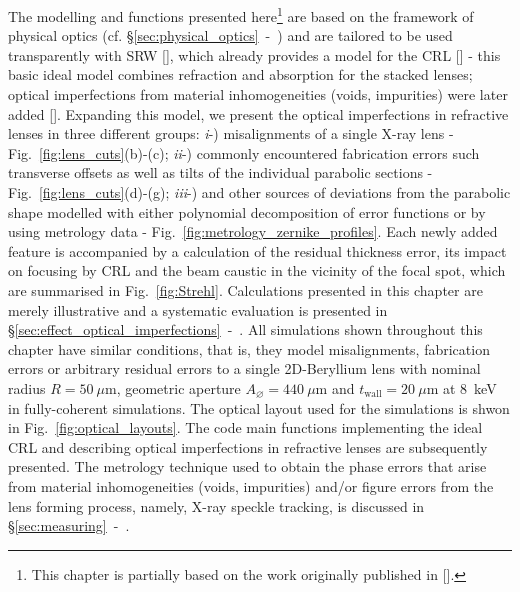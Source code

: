 \begin{refsection}
The modelling and functions presented here\footnote{This chapter is partially based on the work originally published in [\cite{Celestre2020b}].} are based on the framework of physical optics (cf. \S\ref{sec:physical_optics}~-~\textit{}) and are tailored to be used transparently with SRW [\cite{Chubar1998}], which already provides a model for the CRL [\cite{Baltser2011}] - this basic ideal model combines refraction and absorption for the stacked lenses; optical imperfections from material inhomogeneities (voids, impurities) were later added [\cite{Roth2014}]. Expanding this model, we present the optical imperfections in refractive lenses in three different groups: \textit{i}-) misalignments of a single X-ray lens - Fig.~\ref{fig:lens_cuts}(b)-(c); \textit{ii}-) commonly encountered fabrication errors such transverse offsets as well as tilts of the individual parabolic sections - Fig.~\ref{fig:lens_cuts}(d)-(g); \textit{iii}-) and other sources of deviations from the parabolic shape modelled with either polynomial decomposition of error functions or by using metrology data - Fig.~\ref{fig:metrology_zernike_profiles}. Each newly added feature is accompanied by a calculation of the residual thickness error, its impact on focusing by CRL and the beam caustic in the vicinity of the focal spot, which are summarised in Fig.~\ref{fig:Strehl}. Calculations presented in this chapter are merely illustrative and a systematic evaluation is presented in \S\ref{sec:effect_optical_imperfections}~-~\textit{}. All simulations shown throughout this chapter have similar conditions, that is, they model misalignments, fabrication errors or arbitrary residual errors to a single 2D-Beryllium lens with nominal radius $R=50~\mu\text{m}$, geometric aperture $A_{\diameter}=440~\mu\text{m}$ and $t_\text{wall}=20~\mu$m at 8~keV in fully-coherent simulations. The optical layout used for the simulations is shwon in Fig.~\ref{fig:optical_layouts}. The code main functions implementing the ideal CRL and describing optical imperfections in refractive lenses are subsequently presented. The metrology technique used to obtain the phase errors that arise from material inhomogeneities (voids, impurities) and/or figure errors from the lens forming process, namely, X-ray speckle tracking, is discussed in \S\ref{sec:measuring}~-~\textit{}.


\end{refsection}
